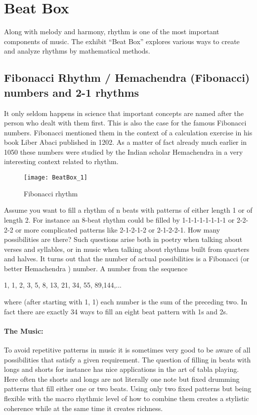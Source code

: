 \section{Beat Box}
Along with melody and harmony, rhythm is one of the most important components of music. The exhibit ``Beat Box'' explores various ways to create and analyze rhythms by mathematical methods.

\subsection{Fibonacci Rhythm / Hemachendra (Fibonacci) numbers and 2-1 rhythms}
It only seldom happens in science that important concepts are named after the person who dealt with them first. This is also the case for the famous Fibonacci numbers. Fibonacci mentioned them in the context of a calculation exercise in his book Liber Abaci published in 1202. As a matter of fact already much earlier in 1050 these numbers were studied by the Indian scholar Hemachendra in a very interesting context related to rhythm.

\begin{wrapfigure}[24]{l}{0.4\textwidth}
\centering
\texttt{[image: BeatBox\_1]}
\caption*{Fibonacci rhythm}
\end{wrapfigure}
Assume you want to fill a rhythm of n beats with patterns of either length 1 or of length 2. For instance an 8-beat rhythm could be filled by 1-1-1-1-1-1-1-1 or 2-2-2-2 or more complicated patterns like 2-1-2-1-2 or 2-1-2-2-1. How many possibilities are there? Such questions arise both in poetry when talking about verses and syllables, or in music when talking about rhythms built from quarters and halves. It turns out that the number of actual possibilities is a Fibonacci (or better Hemachendra ) number. A number from the sequence

1, 1, 2, 3, 5, 8, 13, 21, 34, 55, 89,144,...

where (after starting with 1, 1) each number is the sum of the preceding two. In fact there are exactly 34 ways to fill an eight beat pattern with 1s and 2s.

\paragraph{The Music:}
To avoid repetitive patterns in music it is sometimes very good to be aware of all possibilities that satisfy a given requirement. The question of filling in beats with longs and shorts for instance has nice applications in the art of tabla playing. Here often the shorts and longs are not literally one note but fixed drumming patterns that fill either one or two beats. Using only two fixed patterns but being flexible with the macro rhythmic level of how to combine them creates a stylistic coherence while at the same time it creates richness.

